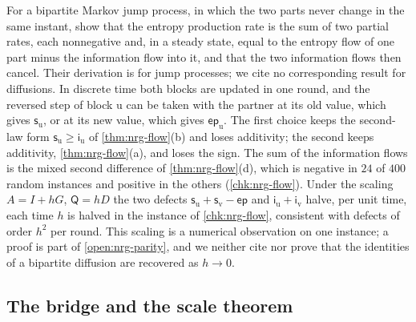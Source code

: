 \begin{remark}\label{rem:nrg-continuous}
For a bipartite Markov jump process, in which the two parts never change in the same instant, \citet{horowitz2014thermodynamics} show that the entropy production rate is the sum of two partial rates, each nonnegative and, in a steady state, equal to the entropy flow of one part minus the information flow into it, and that the two information flows then cancel. Their derivation is for jump processes; we cite no corresponding result for diffusions. In discrete time both blocks are updated in one round, and the reversed step of block $\mathrm u$ can be taken with the partner at its old value, which gives $\mathsf s_{\mathrm u}$, or at its new value, which gives $\mathsf{ep}_{\mathrm u}$. The first choice keeps the second-law form $\mathsf s_{\mathrm u}\ge\mathsf i_{\mathrm u}$ of \cref{thm:nrg-flow}(b) and loses additivity; the second keeps additivity, \cref{thm:nrg-flow}(a), and loses the sign. The sum of the information flows is the mixed second difference of \cref{thm:nrg-flow}(d), which is negative in $24$ of $400$ random instances and positive in the others (\cref{chk:nrg-flow}). Under the scaling $A=I+hG$, $\mathsf Q=hD$ the two defects $\mathsf s_{\mathrm u}+\mathsf s_{\mathrm v}-\mathsf{ep}$ and $\mathsf i_{\mathrm u}+\mathsf i_{\mathrm v}$ halve, per unit time, each time $h$ is halved in the instance of \cref{chk:nrg-flow}, consistent with defects of order $h^2$ per round. This scaling is a numerical observation on one instance; a proof is part of \cref{open:nrg-parity}, and we neither cite nor prove that the identities of a bipartite diffusion are recovered as $h\to0$.
\end{remark}

\subsection*{The bridge and the scale theorem}

